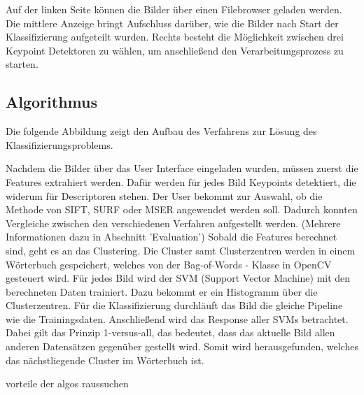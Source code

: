 \documentclass[liststotoc,11pt,a4paper]{article}
\begin{document}

Auf der linken Seite können die Bilder über einen Filebrowser geladen werden. Die mittlere Anzeige bringt Aufschluss darüber, wie die Bilder nach Start der Klassifizierung aufgeteilt wurden. Rechts besteht die Möglichkeit zwischen drei Keypoint Detektoren zu wählen, um anschließend den Verarbeitungsprozess zu starten. %

\subsection{Algorithmus}

Die folgende Abbildung zeigt den Aufbau des Verfahrens zur Lösung des Klassifizierungsproblems.


Nachdem die Bilder über das User Interface eingeladen wurden, müssen zuerst die Features extrahiert werden. Dafür werden für jedes Bild Keypoints detektiert, die widerum für Descriptoren stehen. Der User bekommt zur Auswahl, ob die Methode von SIFT, SURF oder MSER angewendet werden soll. Dadurch konnten Vergleiche zwischen den verschiedenen Verfahren aufgestellt werden. (Mehrere Informationen dazu in Abschnitt 'Evaluation')
Sobald die Features berechnet sind, geht es an das Clustering. Die Cluster samt Clusterzentren werden in einem Wörterbuch gespeichert, welches von der Bag-of-Words - Klasse in OpenCV gesteuert wird. Für jedes Bild wird der SVM (Support Vector Machine) mit den berechneten Daten trainiert. Dazu bekommt er ein Histogramm über die Clusterzentren. Für die Klassifizierung durchläuft das Bild die gleiche Pipeline wie die Trainingsdaten. Anschließend wird das Response aller SVMs betrachtet. Dabei gilt das Prinzip 1-versus-all, das bedeutet, dass das aktuelle Bild allen anderen Datensätzen gegenüber gestellt wird. Somit wird herausgefunden, welches das nächstliegende Cluster im Wörterbuch ist.


vorteile der algos raussuchen


\end{document}

